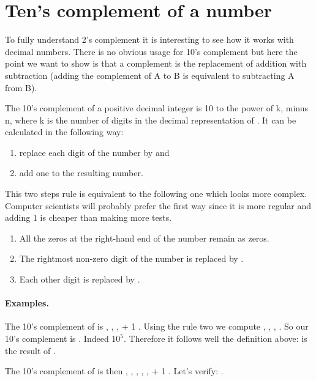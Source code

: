 \documentclass[a4paper,10pt,twoside]{book}
\begin{document}
%

\section{Ten's complement of a number}

To fully understand 2's complement it is interesting to see how it works with decimal numbers. There is no obvious usage for 10's complement but here the point we want to show is that a complement is the replacement of addition with subtraction (\ie adding the complement of A to B is equivalent to subtracting A from B).


The 10's complement of a positive decimal integer  is 10 to the power of k, minus n, where k is the number of digits in the decimal representation of . It can be calculated in the following way: 

\begin{enumerate}
\item replace each digit  of the number by  and  
\item add one to the resulting number.
\end{enumerate}

This two steps rule is equivalent to the following one which looks more complex. Computer scientists will probably prefer the first way since it is more regular and adding 1 is cheaper than making more tests.

\begin{enumerate}
\item All the zeros at the right-hand end of the number remain as zeros. 
\item The rightmost non-zero digit  of the number is replaced by . 
\item Each other digit  is replaced by . 
\end{enumerate}

\paragraph{Examples.}
The 10's complement of  is , , ,  + 1 \ie {} \ie {}. 
Using the rule two we compute , , ,  \ie {}. So our 10's complement is . Indeed  $10^{5}$. Therefore it follows well the definition above:  is the result of .

The 10's complement of  is then , , , , ,  + 1 \ie {} \ie {}. Let's verify: .
 
\end{document}
